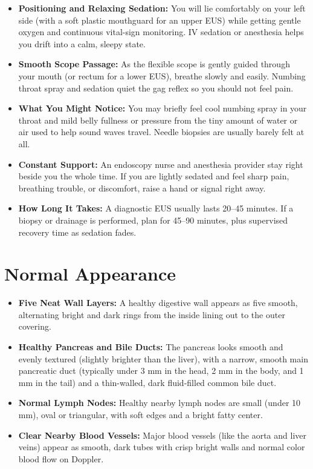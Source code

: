 \begin{itemize}
    \item \textbf{Positioning and Relaxing Sedation:} You will lie comfortably on your left side (with a soft plastic mouthguard for an upper EUS) while getting gentle oxygen and continuous vital-sign monitoring. IV sedation or anesthesia helps you drift into a calm, sleepy state.
    \item \textbf{Smooth Scope Passage:} As the flexible scope is gently guided through your mouth (or rectum for a lower EUS), breathe slowly and easily. Numbing throat spray and sedation quiet the gag reflex so you should not feel pain.
    \item \textbf{What You Might Notice:} You may briefly feel cool numbing spray in your throat and mild belly fullness or pressure from the tiny amount of water or air used to help sound waves travel. Needle biopsies are usually barely felt at all.
    \item \textbf{Constant Support:} An endoscopy nurse and anesthesia provider stay right beside you the whole time. If you are lightly sedated and feel sharp pain, breathing trouble, or discomfort, raise a hand or signal right away.
    \item \textbf{How Long It Takes:} A diagnostic EUS usually lasts 20--45 minutes. If a biopsy or drainage is performed, plan for 45--90 minutes, plus supervised recovery time as sedation fades.
\end{itemize}

\section{Normal Appearance}

\begin{itemize}
    \item \textbf{Five Neat Wall Layers:} A healthy digestive wall appears as five smooth, alternating bright and dark rings from the inside lining out to the outer covering.
    \item \textbf{Healthy Pancreas and Bile Ducts:} The pancreas looks smooth and evenly textured (slightly brighter than the liver), with a narrow, smooth main pancreatic duct (typically under 3 mm in the head, 2 mm in the body, and 1 mm in the tail) and a thin-walled, dark fluid-filled common bile duct.
    \item \textbf{Normal Lymph Nodes:} Healthy nearby lymph nodes are small (under 10 mm), oval or triangular, with soft edges and a bright fatty center.
    \item \textbf{Clear Nearby Blood Vessels:} Major blood vessels (like the aorta and liver veins) appear as smooth, dark tubes with crisp bright walls and normal color blood flow on Doppler.
\end{itemize}


